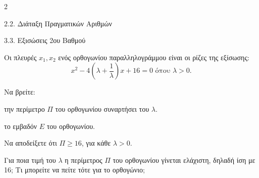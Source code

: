 \begin{ylh}{2}
    \item 2.2. Διάταξη Πραγματικών Αριθμών
    \item 3.3. Εξισώσεις 2ου Βαθμού
\end{ylh}
Oι πλευρές $x_1, x_2$ ενός ορθογωνίου παραλληλογράμμου είναι οι ρίζες της εξίσωσης:
\[x^2 - 4\left(\lambda + \dfrac{1}{\lambda}\right)x + 16 = 0 \text{ όπου } \lambda > 0.\]
\begin{alist}
\item Να βρείτε:
\begin{rlist}
\item την περίμετρο $\Pi$ του ορθογωνίου συναρτήσει του $\lambda$.
\item το εμβαδόν $E$ του ορθογωνίου.
\end{rlist}
\item Να αποδείξετε ότι $\Pi \ge 16$, για κάθε $\lambda > 0$.
\item Για ποια τιμή του $\lambda$ η περίμετρος $\Pi$ του ορθογωνίου γίνεται ελάχιστη, δηλαδή ίση με 16; Τι μπορείτε να πείτε τότε για το ορθογώνιο;

\end{alist}

